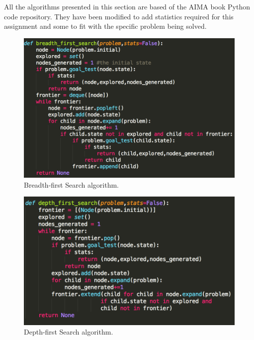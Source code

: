\documentclass[12pt, letter]{article}
\begin{document}
All the algorithms presented in this section are based of the AIMA book Python code repository. They have been modified to add statistics required for this assignment and some to fit with the specific problem being solved.

\begin{figure}[htb]
  \centering
  \includegraphics[width=0.9 \textwidth]{./graphs/bfs.png}
  \caption{Breadth-first Search algorithm.}
\end{figure}

\begin{figure}[htb]
  \centering
  \includegraphics[width=0.9 \textwidth]{./graphs/dfs.png}
  \caption{Depth-first Search algorithm.}
\end{figure}
\end{document}
